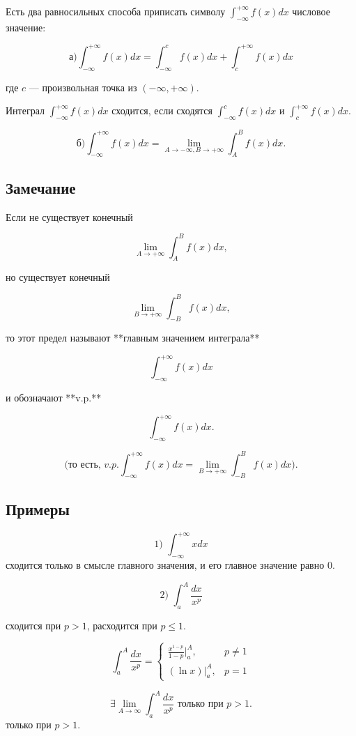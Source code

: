 {Есть два равносильных способа приписать символу \( \int_{-\infty}^{+\infty} f(x)dx \) числовое значение:

\[
\text{а)} \int_{-\infty}^{+\infty} f(x)dx = \int_{-\infty}^{c} f(x)dx + \int_{c}^{+\infty} f(x)dx
\]

где \( c \) — произвольная точка из \( (-\infty, +\infty) \).

Интеграл \( \int_{-\infty}^{+\infty} f(x)dx \) сходится, если сходятся \( \int_{-\infty}^{c} f(x)dx \) и \( \int_{c}^{+\infty} f(x)dx \).

\[
\text{б)} \int_{-\infty}^{+\infty} f(x)dx = \lim_{A \to -\infty, B \to +\infty} \int_{A}^{B} f(x)dx.
\]

\subsection*{Замечание}

Если не существует конечный 



\[
\lim_{A \to +\infty} \int_{A}^{B} f(x)dx,
\]



но существует конечный 



\[
\lim_{B \to +\infty} \int_{-B}^{B} f(x)dx,
\]



то этот предел называют **главным значением интеграла** 



\[
\int_{-\infty}^{+\infty} f(x)dx
\]



и обозначают **v.p.** 



\[
\int_{-\infty}^{+\infty} f(x)dx.
\]

\[
\text{(то есть, }v.p. \int_{-\infty}^{+\infty} f(x)dx = \lim_{B \to +\infty} \int_{-B}^{B} f(x)dx).
\]

\subsection*{Примеры}


\[
\text{1) }\int_{-\infty}^{+\infty} x dx
\]
сходится только в смысле главного значения, и его главное значение равно 0.

\[
\text{2) } \int_{a}^{A} \frac{dx}{x^p}
\]

сходится при \( p > 1 \), расходится при \( p \leq 1 \).

\[
\int_{a}^{A} \frac{dx}{x^p} =
\begin{cases} 
\frac{x^{1-p}}{1-p} \Big|_{a}^{A}, & p \neq 1 \\
(\ln x) \Big|_{a}^{A}, & p = 1
\end{cases}
\]

\[
\exists \lim_{A \to \infty} \int_{a}^{A} \frac{dx}{x^p} \text{ только при }  p > 1.
\]
только при \( p > 1 \).


}